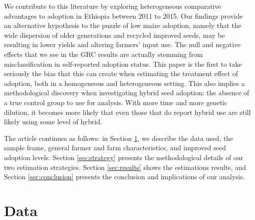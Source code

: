 \documentclass[11pt]{article}
\begin{document}
We contribute to this literature by exploring heterogeneous comparative advantages to adoption in Ethiopia between 2011 to 2015. %
Our findings provide an alternative hypothesis to the puzzle of low maize adoption, namely that the wide dispersion of older generations and recycled improved seeds, may be resulting in lower yields and altering farmers' input use. The null and negative effects that we see in the GRC results are actually stemming from misclassification in self-reported adoption status. This paper is the first to take seriously the bias that this can create when estimating the treatment effect of adoption, both in a homogeneous and heterogeneous setting. This also implies a methodological discovery when investigating hybrid seed adoption: the absence of a true control group to use for analysis. With more time and more genetic dilution, it becomes more likely that even those that do report hybrid use are still likely using some level of hybrid.



The article continues as follows: in Section \ref{sec:data}, we describe the data used, the sample frame, general farmer and farm characteristics, and improved seed adoption levels. Section \ref{sec:strategy} presents the methodological details of our two estimation strategies. Section \ref{sec:results} shows the estimations results, and Section \ref{sec:conclusion} presents the conclusion and implications of our analysis.


\section{Data}\label{sec:data}
\end{document}
